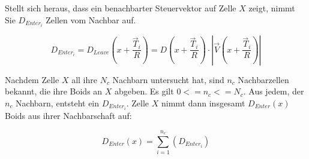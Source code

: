 \documentclass[a4paper, 10pt, journal]{wissarbIEEE}      %
\begin{document}
Stellt sich heraus, dass ein benachbarter Steuervektor auf Zelle $X$ zeigt, nimmt Sie $D_{Enter_i}$ Zellen vom Nachbar auf.

\begin{equation}
D_{Enter_i} = D_{Leave}(x+\dfrac{\vec{T}_i}{R}) = D(x+\dfrac{\vec{T}_i}{R}) \cdot |\vec{V}(x+\dfrac{\vec{T}_i}{R})| 
\label{Form_D_V_Nachbar}
\end{equation}

Nachdem Zelle $X$ all ihre $N_c$ Nachbarn untersucht hat, sind $n_c$ Nachbarzellen bekannt, die ihre Boids an $X$ abgeben. Es gilt $0<=n_c<=N_c$. Aus jedem, der $n_c$ Nachbarn, entsteht ein $D_{Enter_i}$. Zelle $X$ nimmt dann insgesamt $D_{Enter}(x)$ Boids aus ihrer Nachbarschaft auf:

\begin{equation}
D_{Enter}(x) = \sum_{i=1}^{n_c} ( D_{Enter_i})
\label{Form_D_EnterFinal}
\end{equation}

\end{document}
